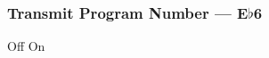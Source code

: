 \subsubsection{Transmit Program Number --- E$\flat$6}









































Off
On

